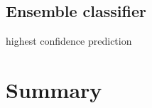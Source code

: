 \documentclass{article} %
\begin{document}
\subsection{Ensemble classifier}

highest confidence prediction







\section{Summary}














\end{document}
